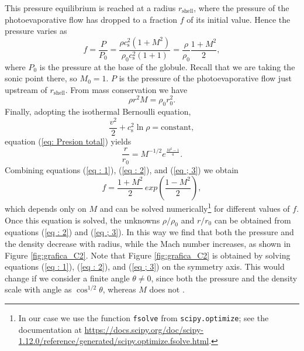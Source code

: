 \documentclass{book}
\begin{document}
This pressure equilibrium is reached at a radius $r_\mathrm{shell}$,
where the pressure of the photoevaporative flow has dropped to a
fraction $f$ of its initial value. Hence the pressure varies as
\begin{equation}\label{eq : 1}
f=\frac{P}{P_0}=\frac{\rho c_\mathrm{s}^2(1+M^2)}{\rho_0 c_\mathrm{s}^2(1+1)}=\frac{\rho}{\rho_0}\frac{1+M^2}{2},
\end{equation}
where $P_0$ is the pressure at the base of the globule. Recall that we
are taking the sonic point there, so $M_0=1$. $P$ is the pressure of
the photoevaporative flow just upstream of $r_\mathrm{shell}$. From
mass conservation we have
\begin{equation}\label{eq : 2}
\rho r^2M	=\rho_0 r_0^2.
\end{equation}
Finally, adopting the isothermal Bernoulli equation,
\begin{equation}
\frac{v^2}{2}+c_\mathrm{s}^2\ln\rho=\text{constant},
\end{equation}
equation (\ref{eq: Presion total}) yields \citep{Dyson:1968}
\begin{equation}\label{eq ; 3} \frac{r}{r_0}=M^{-1/2}e^{\frac{M^2-1}{4}}.
\end{equation}
Combining equations (\ref{eq : 1}), (\ref{eq : 2}), and (\ref{eq ; 3})
we obtain
\begin{equation}
    f=\frac{1+M^2}{2}\,exp\left(\frac{1-M^2}{2}\right),
\end{equation}
which depends only on $M$ and can be solved numerically\footnote{In
  our case we use the function \texttt{fsolve} from
  \texttt{scipy.optimize}; see the documentation at
  \url{https://docs.scipy.org/doc/scipy-1.12.0/reference/generated/scipy.optimize.fsolve.html}.}
for different values of $f$. Once this equation is solved, the
unknowns $\rho/\rho_0$ and $r/r_0$ can be obtained from equations
(\ref{eq : 2}) and (\ref{eq ; 3}). In this way we find that both the
pressure and the density decrease with radius, while the Mach number
increases, as shown in Figure \ref{fig:grafica_C2}. Note that Figure
\ref{fig:grafica_C2} is obtained by solving equations (\ref{eq : 1}),
(\ref{eq : 2}), and (\ref{eq ; 3}) on the symmetry axis. This would
change if we consider a finite angle $\theta\neq 0$, since both the
pressure and the density scale with angle as $\cos^{1/2}\theta$,
whereas $M$ does not \citep{Tarango:2018}.
\end{document}
